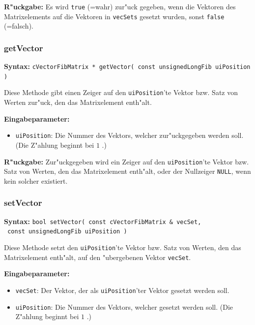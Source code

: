 \bigskip\noindent
\textbf{R"uckgabe:} Es wird \verb|true| (=wahr) zur"uck gegeben, wenn die Vektoren des Matrixelements auf die Vektoren in \verb|vecSets| gesetzt wurden, sonst \verb|false| (=falsch).


\subsubsection{getVector}

\textbf{Syntax:} \verb|cVectorFibMatrix * getVector( const unsignedLongFib uiPosition )|

\bigskip\noindent
Diese Methode gibt einen Zeiger auf den \verb|uiPosition|'te Vektor bzw. Satz von Werten zur"uck, den das Matrixelement enth"alt.

\bigskip\noindent
\textbf{Eingabeparameter:}
\begin{itemize}
 \item \verb|uiPosition|: Die Nummer des Vektors, welcher zur"uckgegeben werden soll. (Die Z"ahlung beginnt bei $1$ .)
\end{itemize}

\bigskip\noindent
\textbf{R"uckgabe:} Zur"uckgegeben wird ein Zeiger auf den \verb|uiPosition|'te Vektor bzw. Satz von Werten, den das Matrixelement enth"alt, oder der Nullzeiger \verb|NULL|, wenn kein solcher existiert.


\subsubsection{setVector}

\textbf{Syntax:} \verb|bool setVector( const cVectorFibMatrix & vecSet,| \\\verb| const unsignedLongFib uiPosition )|

\bigskip\noindent
Diese Methode setzt den \verb|uiPosition|'te Vektor bzw. Satz von Werten, den das Matrixelement enth"alt, auf den "ubergebenen Vektor \verb|vecSet|.

\bigskip\noindent
\textbf{Eingabeparameter:}
\begin{itemize}
 \item \verb|vecSet|: Der Vektor, der als \verb|uiPosition|'ter Vektor gesetzt werden soll.
 \item \verb|uiPosition|: Die Nummer des Vektors, welcher gesetzt werden soll. (Die Z"ahlung beginnt bei $1$ .)
\end{itemize}

